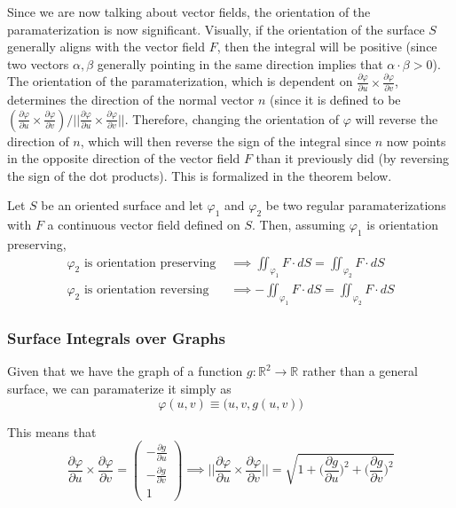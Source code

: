   Since we are now talking about vector fields, the orientation of the paramaterization is now significant. Visually, if the orientation of the surface $S$ generally aligns with the vector field $F$, then the integral will be positive (since two vectors $\alpha, \beta$ generally pointing in the same direction implies that $\alpha \cdot \beta > 0$). The orientation of the paramaterization, which is dependent on $\frac{\partial \varphi}{\partial u} \times \frac{\partial \varphi}{\partial v}$, determines the direction of the normal vector $n$ (since it is defined to be $(\frac{\partial \varphi}{\partial u} \times \frac{\partial \varphi}{\partial v}) / \big|\big|\frac{\partial \varphi}{\partial u} \times \frac{\partial \varphi}{\partial v}\big|\big|$. Therefore, changing the orientation of $\varphi$ will reverse the direction of $n$, which will then reverse the sign of the integral since $n$ now points in the opposite direction of the vector field $F$ than it previously did (by reversing the sign of the dot products). This is formalized in the theorem below. 

  \begin{theorem}
		Let $S$ be an oriented surface and let $\varphi_1$ and $\varphi_2$ be two regular paramaterizations with $F$ a continuous vector field defined on $S$. Then, assuming $\varphi_1$ is orientation preserving, 
		\begin{align}
			\varphi_2 \text{ is orientation preserving } & \implies \iint_{\varphi_1} F \cdot d S = \iint_{\varphi_2} F \cdot d S \\
			\varphi_2 \text{ is orientation reversing } & \implies - \iint_{\varphi_1} F \cdot d S = \iint_{\varphi_2} F \cdot d S 
		\end{align}
  \end{theorem}

\subsubsection{Surface Integrals over Graphs}

  Given that we have the graph of a function $g: \mathbb{R}^2 \longrightarrow \mathbb{R}$ rather than a general surface, we can paramaterize it simply as
	\begin{equation}
  	\varphi(u, v) \equiv \big(u, v, g(u, v) \big)
	\end{equation}

  This means that 
	\begin{equation}
		\frac{\partial \varphi}{\partial u} \times \frac{\partial \varphi}{\partial v} = 
		\begin{pmatrix}
		-\frac{\partial g}{\partial u} \\ -\frac{\partial g}{\partial v} \\ 1
		\end{pmatrix} \implies \bigg|\bigg|\frac{\partial \varphi}{\partial u} \times \frac{\partial \varphi}{\partial v} \bigg|\bigg| = \sqrt{1 + \Big(\frac{\partial g}{\partial u}\Big)^2 + \Big( \frac{\partial g}{\partial v}\Big)^2}
	\end{equation}

